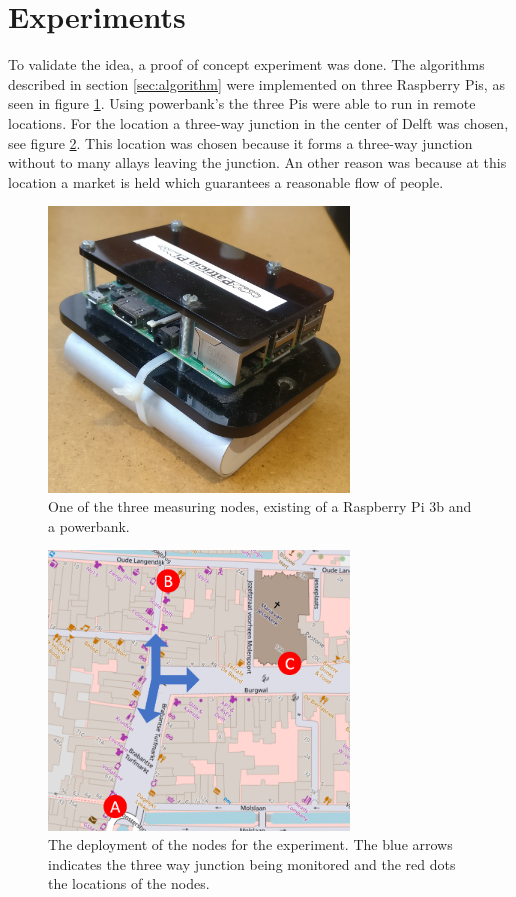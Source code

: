 \documentclass{IEEEtran}
\begin{document}
\section{Experiments}
To validate the idea, a proof of concept experiment was done. The algorithms described in section \ref{sec:algorithm} were implemented on three Raspberry Pis, as seen in figure \ref{fig:pi}. Using powerbank's the three Pis were able to run in remote locations. For the location a three-way junction in the center of Delft was chosen, see figure \ref{fig:markt}. This location was chosen because it forms a three-way junction without to many allays leaving the junction. An other reason was because at this location a market is held which guarantees a reasonable flow of people.

\begin{figure}
    \centering
    \includegraphics[width=80mm]{images/Pi.jpg}
    \caption{One of the three measuring nodes, existing of a Raspberry Pi 3b and a powerbank.}
    \label{fig:pi}
\end{figure}

\begin{figure}
    \centering
    \includegraphics[width=80mm]{images/marketcapture.png}
    \caption{The deployment of the nodes for the experiment. The blue arrows indicates the three way junction being monitored and the red dots the locations of the nodes.}
    \label{fig:markt}
\end{figure}
\end{document}
